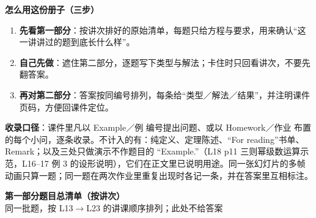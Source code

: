 \documentclass[10.5pt]{ctexart}
\newcommand{\parttitle}[2]{%
  \par\vspace{6pt}\begin{center}
  {\color{deepblue}\LARGE\bfseries #1}\\[3pt]
  {\color{inkgray}\small #2}
  \end{center}\vspace{4pt}}
\begin{document}
\vspace{0.35cm}
\begin{center}
\begin{minipage}{0.9\linewidth}
\small
\textbf{怎么用这份册子（三步）}
\begin{enumerate}[label=\arabic*.]
  \item \textbf{先看第一部分}：按讲次排好的原始清单，每题只给方程与要求，用来确认“这一讲讲过的题到底长什么样”。
  \item \textbf{自己先做}：遮住第二部分，逐题写下类型与解法；卡住时只回看讲次，不要先翻答案。
  \item \textbf{再对第二部分}：答案按同编号排列，每条给“类型／解法／结果”，并注明课件页码，方便回课件定位。
\end{enumerate}
\vspace{2pt}
\textbf{收录口径}：课件里凡以 Example／例 编号提出问题、或以 Homework／作业 布置的每个小问，逐条收录。不计入的有：纯定义、定理陈述、“For reading”书单、Remark；以及三处只做演示不作题目的 “Example.”（L18 p11 三则幂级数运算示范，L16--17 例 3 的设形说明），它们在正文里已说明用途。同一张幻灯片的多帧动画只算一题；同一题在两次作业里重复出现时各记一条，并在答案里互相标注。
\end{minipage}
\end{center}
\clearpage

\parttitle{第一部分\quad 题目总清单（按讲次）}{同一批题，按 L13$\to$L23 的讲课顺序排列；此处不给答案}
\end{document}

